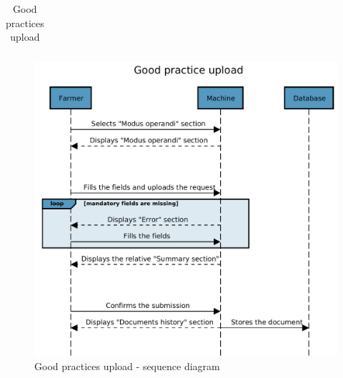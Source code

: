 \begin{table}[H]
\begin{tabular}{|l|p{}|}
    \end{tabular}

\caption{\label{tab:good_practice_submission}Good practices upload}
\end{table}

\begin{figure}[H]
	\centering
    \includegraphics[page=1, width=\textwidth]{Images/SeqDiag/good_practice_seq_diag.pdf}
	\caption{\label{fig:good_practice_seq_diag}Good practices upload - sequence diagram}
\end{figure}


